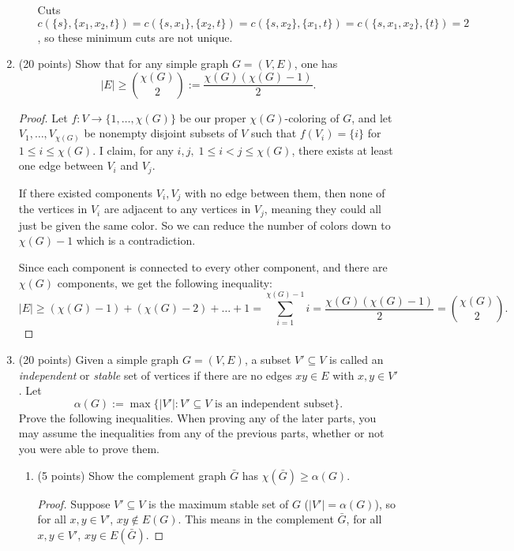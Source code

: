 \documentclass[11pt]{article}
\newcommand{\n}{\vspace{0.3cm}}
\begin{document}
\begin{enumerate}
\begin{enumerate}[label=(\alph*)]
\begin{center}
          \end{center}
          Cuts \(c(\{s\},\{x_1,x_2,t\}) = c(\{s,x_1\},\{x_2,t\}) = c(\{s,x_2\},\{x_1,t\}) = c(\{s,x_1,x_2\},\{t\}) = 2\), so these minimum cuts are not unique.
      \end{enumerate} \n

    \item (20 points) Show that for any simple graph \(G = (V,E)\), one has
      \[|E| \geq \binom{\chi(G)}{2} := \frac{\chi(G)(\chi(G)-1)}{2}.\]
      \begin{proof}
        Let \(f \colon V \to \{1, \hdots, \chi(G)\}\) be our proper \(\chi(G)\)-coloring of \(G\), and let \(V_1, \hdots, V_{\chi(G)}\) be nonempty disjoint subsets of \(V\) such that \(f(V_i) = \{i\}\) for \(1 \leq i \leq \chi(G)\).  I claim, for any \(i,j, \; 1 \leq i < j \leq \chi(G)\), there exists at least one edge between \(V_i\) and \(V_j\). \n

        If there existed components \(V_i,V_j\) with no edge between them, then none of the vertices in \(V_i\) are adjacent to any vertices in \(V_j\), meaning they could all just be given the same color.  So we can reduce the number of colors down to \(\chi(G)-1\) which is a contradiction. \n

        Since each component is connected to every other component, and there are \(\chi(G)\) components, we get the following inequality:
        \[|E| \geq (\chi(G)-1) + (\chi(G)-2) + \hdots + 1 = \sum_{i=1}^{\chi(G)-1} i = \frac{\chi(G)(\chi(G)-1)}{2} = \binom{\chi(G)}{2}.\]
      \end{proof}
      

    \item (20 points) Given a simple graph \(G = (V,E)\), a subset \(V' \subseteq V\) is called an \textit{independent} or \textit{stable} set of vertices if there are no edges \(xy \in E\) with \(x,y \in V'\). Let
      \[\alpha(G) := \max \{|V'| \colon V' \subseteq V \text{ is an independent subset}\}.\]
      Prove the following inequalities.  When proving any of the later parts, you may assume the inequalities from any of the previous parts, whether or not you were able to prove them.
      \begin{enumerate}[label=(\alph*)]
        \item (5 points) Show the complement graph \(\bar G\) has \(\chi(\bar G) \geq \alpha(G)\).
          \begin{proof}
            Suppose \(V' \subseteq V\) is the maximum stable set of \(G\) (\(|V'| = \alpha(G)\)), so for all \(x,y \in V'\), \(xy \not\in E(G)\).  This means in the complement \(\bar G\), for all \(x,y \in V'\), \(xy \in E(\bar G)\). \n


\end{proof}
\end{enumerate}
\end{enumerate}
\end{document}
